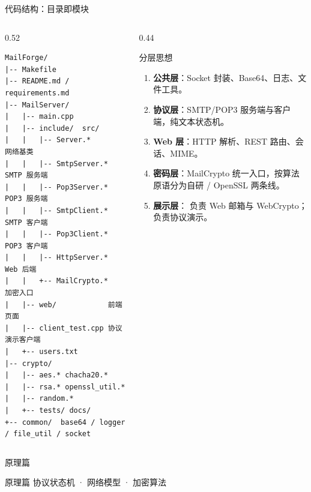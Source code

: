 \documentclass[aspectratio=169,10pt]{beamer}
\newcommand{\key}[1]{\textcolor{MFAccent}{\textbf{#1}}}
\newcommand{\code}[1]{\texttt{\small\detokenize{#1}}}
\begin{document}
\begin{frame}[fragile]{代码结构：目录即模块}
  \begin{columns}[T]
    \begin{column}{0.52\textwidth}
      \begin{lstlisting}[style=protostyle,basicstyle=\ttfamily\scriptsize]
MailForge/
|-- Makefile
|-- README.md / requirements.md
|-- MailServer/
|   |-- main.cpp
|   |-- include/  src/
|   |   |-- Server.*       网络基类
|   |   |-- SmtpServer.*   SMTP 服务端
|   |   |-- Pop3Server.*   POP3 服务端
|   |   |-- SmtpClient.*   SMTP 客户端
|   |   |-- Pop3Client.*   POP3 客户端
|   |   |-- HttpServer.*   Web 后端
|   |   +-- MailCrypto.*   加密入口
|   |-- web/            前端页面
|   |-- client_test.cpp 协议演示客户端
|   +-- users.txt
|-- crypto/
|   |-- aes.* chacha20.*
|   |-- rsa.* openssl_util.*
|   |-- random.*
|   +-- tests/ docs/
+-- common/  base64 / logger / file_util / socket
      \end{lstlisting}
    \end{column}
    \begin{column}{0.44\textwidth}
      \begin{block}{分层思想}
        \begin{enumerate}
          \item \key{公共层}：Socket 封装、Base64、日志、文件工具。
          \item \key{协议层}：SMTP/POP3 服务端与客户端，纯文本状态机。
          \item \key{Web 层}：HTTP 解析、REST 路由、会话、MIME。
          \item \key{密码层}：MailCrypto 统一入口，按算法原语分为自研 / OpenSSL 两条线。
          \item \key{展示层}：\code{index.html} 负责 Web 邮箱与 WebCrypto；\code{demo_*.html} 负责协议演示。
        \end{enumerate}
      \end{block}
    \end{column}
  \end{columns}
\end{frame}
\begin{frame}{原理篇}
  \begin{center}
    \Huge 原理篇
    \vspace{0.5cm}
    \large 协议状态机 · 网络模型 · 加密算法
  \end{center}
\end{frame}
\end{document}
